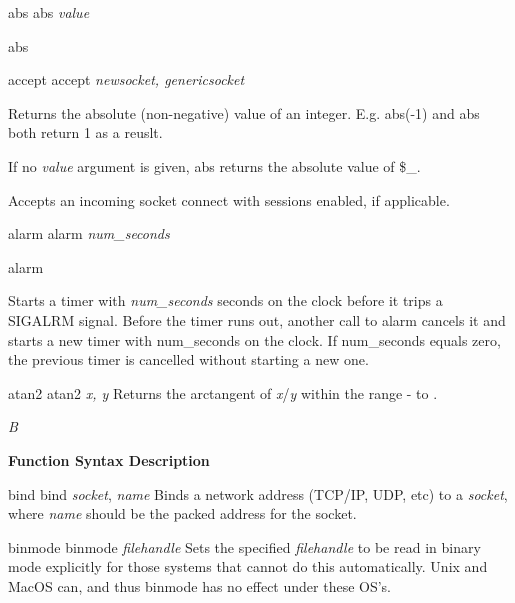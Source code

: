 \documentclass[a4paper,11pt]{book}
\begin{document}
\noindent 

\noindent abs abs \textit{value}

\noindent 

\noindent abs

\noindent 

\noindent 

\noindent 

\noindent 

\noindent accept accept \textit{newsocket, genericsocket}

\noindent 

\noindent Returns the absolute (non-negative) value of an integer. E.g. abs(-1) and abs both return 1 as a reuslt.

\noindent 

\noindent If no \textit{value }argument is given, abs returns the absolute value of \$\_.

\noindent 

\noindent Accepts an incoming socket connect with sessions enabled, if applicable.

\noindent 

\noindent alarm alarm \textit{num\_seconds}

\noindent alarm

\noindent 

\noindent Starts a timer with \textit{num\_seconds }seconds on the clock before it trips a SIGALRM signal. Before the timer runs out, another call to alarm cancels it and starts a new timer with num\_seconds on the clock. If num\_seconds equals zero, the previous timer is cancelled without starting a new one.

\noindent atan2 atan2 \textit{x, y }Returns the arctangent of \textit{x}/\textit{y }within the range - to .

\noindent 

\noindent 

\noindent \textit{B}

\noindent 

\noindent \textbf{Function Syntax Description}

\noindent 

\noindent bind bind \textit{socket}, \textit{name }Binds a network address (TCP/IP, UDP, etc) to a \textit{socket}, where \textit{name }should be the packed address for the socket.

\noindent 

\noindent binmode binmode \textit{filehandle }Sets the specified \textit{filehandle }to be read in binary mode explicitly for those systems that cannot do this automatically. Unix and MacOS can, and thus binmode has no effect under these OS's.
\end{document}
